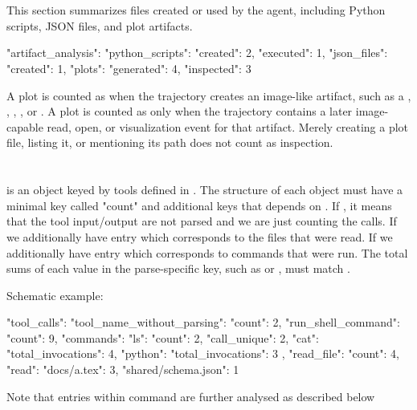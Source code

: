 \documentclass[11pt]{article}
\begin{document}
\section*{}
This section summarizes files created or used by the agent, including Python scripts, JSON files, and plot artifacts.
\begin{DocCode}
{
  "artifact_analysis": {
    "python_scripts": {"created": 2, "executed": 1},
    "json_files": {"created": 1},
    "plots": {
      "generated": 4,
      "inspected": 3
    }
  }
}
\end{DocCode}
A plot is counted as  when the trajectory creates an image-like artifact, such as a , , , , or .
A plot is counted as  only when the trajectory contains a later image-capable read, open, or visualization event for that artifact.
Merely creating a plot file, listing it, or mentioning its path does not count as inspection.

\section*{}
 is an object keyed by tools defined in .
The structure of each object must have a minimal key called "count" and additional keys that depends on .
If , it means that the tool input/output are not parsed and we are just counting the calls.
If  we additionally have  entry which corresponds to the files that were read.
If  we additionally have  entry which corresponds to commands that were run.
The total sums of each value in the parse-specific key, such as  or , must match .

Schematic example:
\begin{DocCode}
{
  "tool_calls": {
    "tool_name_without_parsing": {"count": 2},
    "run_shell_command": {
      "count": 9,
      "commands": {
        "ls": {"count": 2, "call_unique": 2},
        "cat": {"total_invocations": 4},
        "python": {"total_invocations": 3}
      }
    },
    "read_file": {
      "count": 4,
      "read": {
        "docs/a.tex": 3,
        "shared/schema.json": 1
      }
    }
  }
}
\end{DocCode}
Note that entries within command are further analysed as described below
\end{document}
